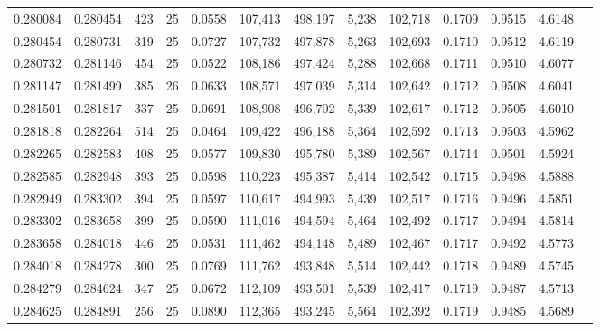 \begin{tabular}{rrrrrrrrrrrrr}
0.280084 & 0.280454 &   423 &  25 &                                     0.0558 & 107,413 & 498,197 &   5,238 & 102,718 & 0.1709 & 0.9515 & 4.6148 \\
0.280454 & 0.280731 &   319 &  25 &                                     0.0727 & 107,732 & 497,878 &   5,263 & 102,693 & 0.1710 & 0.9512 & 4.6119 \\
0.280732 & 0.281146 &   454 &  25 &                                     0.0522 & 108,186 & 497,424 &   5,288 & 102,668 & 0.1711 & 0.9510 & 4.6077 \\
0.281147 & 0.281499 &   385 &  26 &                                     0.0633 & 108,571 & 497,039 &   5,314 & 102,642 & 0.1712 & 0.9508 & 4.6041 \\
0.281501 & 0.281817 &   337 &  25 &                                     0.0691 & 108,908 & 496,702 &   5,339 & 102,617 & 0.1712 & 0.9505 & 4.6010 \\
0.281818 & 0.282264 &   514 &  25 &                                     0.0464 & 109,422 & 496,188 &   5,364 & 102,592 & 0.1713 & 0.9503 & 4.5962 \\
0.282265 & 0.282583 &   408 &  25 &                                     0.0577 & 109,830 & 495,780 &   5,389 & 102,567 & 0.1714 & 0.9501 & 4.5924 \\
0.282585 & 0.282948 &   393 &  25 &                                     0.0598 & 110,223 & 495,387 &   5,414 & 102,542 & 0.1715 & 0.9498 & 4.5888 \\
0.282949 & 0.283302 &   394 &  25 &                                     0.0597 & 110,617 & 494,993 &   5,439 & 102,517 & 0.1716 & 0.9496 & 4.5851 \\
0.283302 & 0.283658 &   399 &  25 &                                     0.0590 & 111,016 & 494,594 &   5,464 & 102,492 & 0.1717 & 0.9494 & 4.5814 \\
0.283658 & 0.284018 &   446 &  25 &                                     0.0531 & 111,462 & 494,148 &   5,489 & 102,467 & 0.1717 & 0.9492 & 4.5773 \\
0.284018 & 0.284278 &   300 &  25 &                                     0.0769 & 111,762 & 493,848 &   5,514 & 102,442 & 0.1718 & 0.9489 & 4.5745 \\
0.284279 & 0.284624 &   347 &  25 &                                     0.0672 & 112,109 & 493,501 &   5,539 & 102,417 & 0.1719 & 0.9487 & 4.5713 \\
0.284625 & 0.284891 &   256 &  25 &                                     0.0890 & 112,365 & 493,245 &   5,564 & 102,392 & 0.1719 & 0.9485 & 4.5689 \\

\end{tabular}
